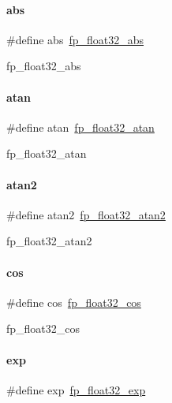 \paragraph{\texorpdfstring{abs}{abs}}
{\footnotesize\ttfamily \#define abs~\mbox{\hyperlink{a00023_a50dbb1be8035ed17c71df34d180056e0}{fp\+\_\+float32\+\_\+abs}}}

fp\+\_\+float32\+\_\+abs \mbox{\label{a00023_a0526fb3466fec955862c2cee3110a6ab}} 
\paragraph{\texorpdfstring{atan}{atan}}
{\footnotesize\ttfamily \#define atan~\mbox{\hyperlink{a00023_afff3776b0834631c841e3799f545f7a0}{fp\+\_\+float32\+\_\+atan}}}

fp\+\_\+float32\+\_\+atan \mbox{\label{a00023_ac371f13b8648d84164686c8f32aa6ed8}} 
\paragraph{\texorpdfstring{atan2}{atan2}}
{\footnotesize\ttfamily \#define atan2~\mbox{\hyperlink{a00023_aa7b8601248d31c15f917e4d8f4f6e9d9}{fp\+\_\+float32\+\_\+atan2}}}

fp\+\_\+float32\+\_\+atan2 \mbox{\label{a00023_a57a66355e043ccefc17aca9338a2b748}} 
\paragraph{\texorpdfstring{cos}{cos}}
{\footnotesize\ttfamily \#define cos~\mbox{\hyperlink{a00023_a76d63763a1fbbbed015ad39ff22a1a99}{fp\+\_\+float32\+\_\+cos}}}

fp\+\_\+float32\+\_\+cos \mbox{\label{a00023_a4bb9b8ff973345c3b4770d31cfb71ea8}} 
\paragraph{\texorpdfstring{exp}{exp}}
{\footnotesize\ttfamily \#define exp~\mbox{\hyperlink{a00023_a595d6a7d9a0a116f0db5bd4cfdbcd166}{fp\+\_\+float32\+\_\+exp}}}

